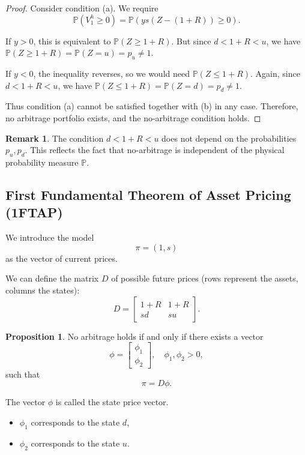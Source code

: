 \documentclass[12pt,a4paper]{article}
\theoremstyle{definition}
\newtheorem{proposition}{Proposition}[section]
\newtheorem{remark}{Remark}[section]
\newcommand{\Prob}{\mathbb{P}}
\begin{document}
\begin{proof}
Consider condition (a). We require
\[
\Prob(V_1^h \geq 0) = \Prob(ys(Z - (1 + R)) \geq 0).
\]

If $y > 0$, this is equivalent to $\Prob(Z \geq 1 + R)$. But since $d < 1 + R < u$, we have $\Prob(Z \geq 1 + R) = \Prob(Z = u) = p_u \neq 1$.

If $y < 0$, the inequality reverses, so we would need $\Prob(Z \leq 1 + R)$. Again, since $d < 1 + R < u$, we have $\Prob(Z \leq 1 + R) = \Prob(Z = d) = p_d \neq 1$.

Thus condition (a) cannot be satisfied together with (b) in any case. Therefore, no arbitrage portfolio exists, and the no-arbitrage condition holds.
\end{proof}

\begin{remark}
The condition $d < 1 + R < u$ does not depend on the probabilities $p_u, p_d$. This reflects the fact that no-arbitrage is independent of the physical probability measure $\Prob$.
\end{remark}

\subsection{First Fundamental Theorem of Asset Pricing (1FTAP)}

We introduce the model
\[
\pi = (1, s)
\]
as the vector of current prices.

We can define the matrix $D$ of possible future prices (rows represent the assets, columns the states):
\[
D = \begin{bmatrix}
1 + R & 1 + R \\
sd & su
\end{bmatrix}.
\]

\begin{proposition}
No arbitrage holds if and only if there exists a vector
\[
\phi = \begin{bmatrix}
\phi_1 \\
\phi_2
\end{bmatrix}, \quad \phi_1, \phi_2 > 0,
\]
such that
\[
\pi = D\phi.
\]
\end{proposition}

The vector $\phi$ is called the state price vector.
\begin{itemize}
\item $\phi_1$ corresponds to the state $d$,
\item $\phi_2$ corresponds to the state $u$.
\end{itemize}
\end{document}
